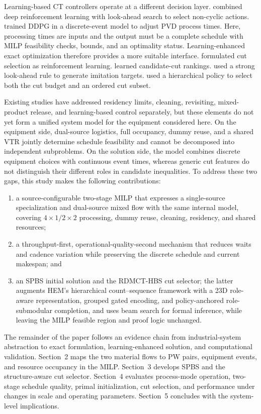 \documentclass[final,5p,times,twocolumn]{elsarticle}
\newcommand{\method}{RDMCT-HBS}
\begin{document}
Learning-based CT controllers operate at a different decision layer. \citet{kim2025adaptivecluster} combined deep reinforcement learning with look-ahead search to select non-cyclic actions. \citet{hong2026ddpgct} trained DDPG in a discrete-event model to adjust PVD process times. Here, processing times are inputs and the output must be a complete schedule with MILP feasibility checks, bounds, and an optimality status. Learning-enhanced exact optimization therefore provides a more suitable interface. \citet{tang2020cut} formulated cut selection as reinforcement learning. \citet{huang2022cutranking} learned candidate-cut rankings. \citet{paulus2022looking} used a strong look-ahead rule to generate imitation targets. \citet{wang2023hem} used a hierarchical policy to select both the cut budget and an ordered cut subset.

Existing studies have addressed residency limits, cleaning, revisiting, mixed-product release, and learning-based control separately, but these elements do not yet form a unified system model for the equipment considered here. On the equipment side, dual-source logistics, full occupancy, dummy reuse, and a shared VTR jointly determine schedule feasibility and cannot be decomposed into independent subproblems. On the solution side, the model combines discrete equipment choices with continuous event times, whereas generic cut features do not distinguish their different roles in candidate inequalities. To address these two gaps, this study makes the following contributions:
\begin{enumerate}[leftmargin=*]
\item a source-configurable two-stage MILP that expresses a single-source specialization and dual-source mixed flow with the same internal model, covering $4\times1/2\times2$ processing, dummy reuse, cleaning, residency, and shared resources;
\item a throughput-first, operational-quality-second mechanism that reduces waits and cadence variation while preserving the discrete schedule and current makespan; and
\item an SPBS initial solution and the \method{} cut selector; the latter augments HEM's hierarchical count--sequence framework with a 23D role-aware representation, grouped gated encoding, and policy-anchored role-submodular completion, and uses beam search for formal inference, while leaving the MILP feasible region and proof logic unchanged.
\end{enumerate}

The remainder of the paper follows an evidence chain from industrial-system abstraction to exact formulation, learning-enhanced solution, and computational validation. Section~2 maps the two material flows to PW pairs, equipment events, and resource occupancy in the MILP. Section~3 develops SPBS and the structure-aware cut selector. Section~4 evaluates process-mode operation, two-stage schedule quality, primal initialization, cut selection, and performance under changes in scale and operating parameters. Section~5 concludes with the system-level implications.
\end{document}
